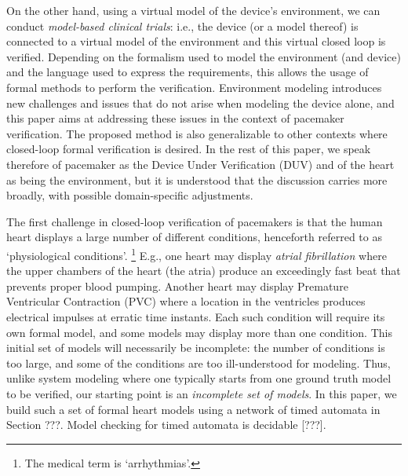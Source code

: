 On the other hand, using a virtual model of the device's environment, we can conduct \emph{model-based clinical trials}: i.e., the device (or a model thereof) is connected to a virtual model of the environment and this virtual closed loop is verified.
Depending on the formalism used to model the environment (and device) and the language used to express the requirements, this allows the usage of formal methods to perform the verification.
Environment modeling introduces new challenges and issues that do not arise when modeling the device alone, and this paper aims at addressing these issues in the context of pacemaker verification.
The proposed method is also generalizable to other contexts where closed-loop formal verification is desired.
In the rest of this paper, we speak therefore of pacemaker as the Device Under Verification (DUV) and of the heart as being the environment, but it is understood that the discussion carries more broadly, with possible domain-specific adjustments.

The first challenge in closed-loop verification of pacemakers is that the human heart displays a large number of different conditions, henceforth referred to as `physiological conditions'.
\footnote{The medical term is `arrhythmias'.} 
E.g., one heart may display \emph{atrial fibrillation} where the upper chambers of the heart (the atria) produce an exceedingly fast beat that prevents proper blood pumping.
Another heart may display Premature Ventricular Contraction (PVC) where a location in the ventricles produces electrical impulses at erratic time instants.
Each such condition will require its own formal model, and some models may display more than one condition.
This initial set of models will necessarily be incomplete: the number of conditions is too large, and some of the conditions are too ill-understood for modeling.
Thus, unlike system modeling where one typically starts from one ground truth model to be verified, our starting point is an \emph{incomplete set of models}.
In this paper, we build such a set of formal heart models using a network of timed automata in Section ???.
Model checking for timed automata is decidable [???].

